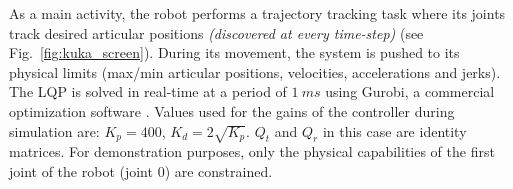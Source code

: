 As a main activity, the robot performs a trajectory tracking task where its joints track desired articular positions \textit{(discovered at every time-step)} (see Fig.~\ref{fig:kuka_screen}). During its movement, the system is pushed to its physical limits (max/min articular positions, velocities, accelerations and jerks). The LQP is solved in real-time at a period of $1~ms$ using Gurobi, a commercial optimization software \cite{gurobi}. Values used for the gains of the controller during simulation are: $K_p=400$, $K_d=2\sqrt{K_p}$. $Q_t$ and $Q_r$ in this case are identity matrices. For demonstration purposes, only the physical capabilities of the first joint of the robot (joint $0$) are constrained. 
